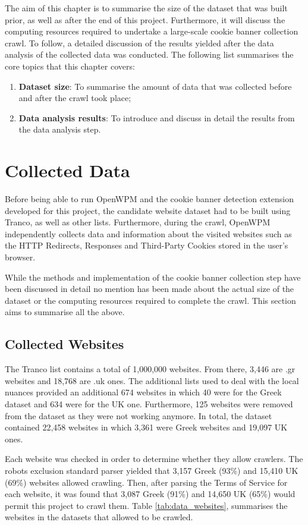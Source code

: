 \documentclass[../main.tex]{subfiles}
\begin{document}
The aim of this chapter is to summarise the size of the dataset that was built prior, as well as after the end of this project. Furthermore, it will discuss the computing resources required to undertake a large-scale cookie banner collection crawl. To follow, a detailed discussion of the results yielded after the data analysis of the collected data was conducted. The following list summarises the core topics that this chapter covers:

\begin{enumerate}
    \item \textbf{Dataset size}: To summarise the amount of data that was collected before and after the crawl took place;
    \item \textbf{Data analysis results}: To introduce and discuss in detail the results from the data analysis step.
\end{enumerate}

\section{Collected Data}
Before being able to run OpenWPM and the cookie banner detection extension developed for this project, the candidate website dataset had to be built  using Tranco, as well as other lists. Furthermore, during the crawl, OpenWPM independently collects data and information about the visited websites such as the HTTP Redirects, Responses and Third-Party Cookies stored in the user’s browser.

While the methods and implementation of the cookie banner collection step have been discussed in detail no mention has been made about the actual size of the dataset or the computing resources required to complete the crawl. This section aims to summarise all the above.

\subsection{Collected Websites}
The Tranco list contains a total of 1,000,000 websites. From there, 3,446 are .gr websites and 18,768 are .uk ones. The additional lists used to deal with the local nuances provided an additional 674 websites in which 40 were for the Greek dataset and 634 were for the UK one. Furthermore, 125 websites were removed from the dataset as they were not working anymore. In total, the dataset contained 22,458 websites in which 3,361 were Greek websites and 19,097 UK ones. 

Each website was checked in order to determine whether they allow crawlers. The robots exclusion standard parser yielded that 3,157 Greek (93\%) and 15,410 UK (69\%) websites allowed crawling. Then, after parsing the Terms of Service for each website, it was found that 3,087 Greek (91\%) and 14,650 UK (65\%) would permit this project to crawl them. Table \ref{tab:data_websites}, summarises the websites in the datasets that allowed to be crawled.
\end{document}
